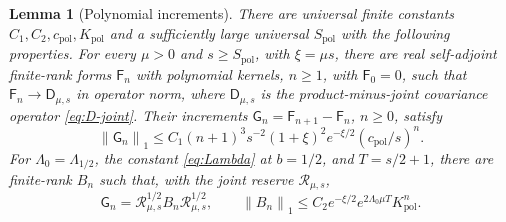 \documentclass[11pt]{amsart}
\numberwithin{equation}{section}
\newtheorem{lemma}[theorem]{Lemma}
\theoremstyle{definition}
\newcommand{\JointRes}{\mathcal R}
\newcommand{\JointD}{\mathsf D}
\newcommand{\norm}[1]{\left\|#1\right\|}
\begin{document}
\begin{lemma}[Polynomial increments]\label{lem:polynomial}
There are universal finite constants \(C_1,C_2,c_{\mathrm{pol}},K_{\mathrm{pol}}\)
and a sufficiently large universal \(S_{\mathrm{pol}}\) with the
following properties. For every \(\mu>0\) and \(s\ge S_{\mathrm{pol}}\),
with \(\xi=\mu s\), there are real self-adjoint finite-rank forms
\(\mathsf F_n\) with polynomial kernels, \(n\ge1\), with
\(\mathsf F_0=0\), such that \(\mathsf F_n\to\JointD_{\mu,s}\) in
operator norm, where \(\JointD_{\mu,s}\) is the product-minus-joint
covariance operator \eqref{eq:D-joint}. Their increments
\(\mathsf G_n=\mathsf F_{n+1}-\mathsf F_n\), \(n\ge0\), satisfy
\begin{equation}
 \norm{\mathsf G_n}_1
 \le C_1(n+1)^3s^{-2}(1+\xi)^2e^{-\xi/2}(c_{\mathrm{pol}}/s)^n.
 \label{eq:increment-unweighted}
\end{equation}
For \(\Lambda_0=\Lambda_{1/2}\), the constant \eqref{eq:Lambda} at
\(b=1/2\), and \(T=s/2+1\), there are finite-rank \(B_n\) such that,
with the joint reserve \(\JointRes_{\mu,s}\),
\begin{equation}
 \mathsf G_n
 =\JointRes_{\mu,s}^{1/2}B_n\JointRes_{\mu,s}^{1/2},
 \qquad
 \norm{B_n}_1
 \le C_2e^{-\xi/2}e^{2\Lambda_0\mu T}K_{\mathrm{pol}}^n.
 \label{eq:increment-weighted}
\end{equation}
\end{lemma}
\end{document}
